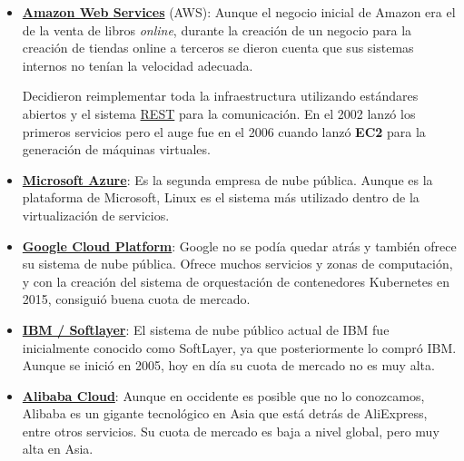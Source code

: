 \begin{itemize}
	\item \textbf{\href{https://aws.amazon.com/es/}{Amazon Web Services}} (AWS): Aunque el negocio inicial de Amazon era el de la venta de libros \textit{online}, durante la creación de un negocio para la creación de tiendas online a terceros se dieron cuenta que sus sistemas internos no tenían la velocidad adecuada.
	
	Decidieron reimplementar toda la infraestructura utilizando estándares abiertos y el sistema \href{https://en.wikipedia.org/wiki/REST}{REST} para la comunicación. En el 2002 lanzó los primeros servicios pero el auge fue en el 2006 cuando lanzó \textbf{EC2} para la generación de máquinas virtuales.
	
	\item \textbf{\href{https://azure.microsoft.com/es-es/}{Microsoft Azure}}: Es la segunda empresa de nube pública. Aunque es la plataforma de Microsoft, Linux es el sistema más utilizado dentro de la virtualización de servicios.
	
	\item \textbf{\href{https://cloud.google.com/}{Google Cloud Platform}}: Google no se podía quedar atrás y también ofrece su sistema de nube pública. Ofrece muchos servicios y zonas de computación, y con la creación del sistema de orquestación de contenedores Kubernetes en 2015, consiguió buena cuota de mercado.
	
	\item \textbf{\href{https://www.ibm.com/cloud}{IBM / Softlayer}}: El sistema de nube público actual de IBM fue inicialmente conocido como SoftLayer, ya que posteriormente lo compró IBM. Aunque se inició en 2005, hoy en día su cuota de mercado no es muy alta.
	
	\item \textbf{\href{https://www.alibabacloud.com/}{Alibaba Cloud}}: Aunque en occidente es posible que no lo conozcamos, Alibaba es un gigante tecnológico en Asia que está detrás de AliExpress, entre otros servicios.  Su cuota de mercado es baja a nivel global, pero muy alta en Asia.
	
\end{itemize}